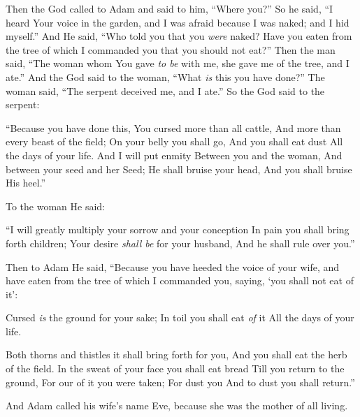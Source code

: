 \bverse Then the \lord God called to Adam and said to him, ``Where \are you?''
\bverse So he said, ``I heard Your voice in the garden, and I was afraid because I was naked; and I hid myself.''
\bverse And He said, ``Who told you that you \textit{were} naked? Have you eaten from the tree of which I commanded you that you should not eat?''
\bverse Then the man said, ``The woman whom You gave \textit{to be} with me, she gave me of the tree, and I ate.''
\bverse And the \lord God said to the woman, ``What \textit{is} this you have done?'' The woman said, ``The serpent deceived me, and I ate.''
\bverse So the \lord God said to the serpent: 
\begin{bquotation}
``Because you have done this, You \are cursed more than all cattle, And more than every beast of the field; On your belly you shall go, And you shall eat dust All the days of your life.
\bverse And I will put enmity Between you and the woman, And between your seed and her Seed; He shall bruise your head, And you shall bruise His heel.''
\end{bquotation}
\bverse To the woman He said: 
\begin{bquotation}
``I will greatly multiply your sorrow and your conception In pain you shall bring forth children; Your desire \textit{shall be} for your husband, And he shall rule over you.''
\end{bquotation}
\bverse Then to Adam He said, ``Because you have heeded the voice of your wife, and have eaten from the tree of which I commanded you, saying, `you shall not eat of it':
\begin{bquotation}
Cursed \textit{is} the ground for your sake; In toil you shall eat \textit{of} it All the days of your life.

\bverse Both thorns and thistles it shall bring forth for you, And you shall eat the herb of the field.
\bverse In the sweat of your face you shall eat bread Till you return to the ground, For our of it you were taken; For dust you \are And to dust you shall return.''
\end{bquotation}
\bverse And Adam called his wife's name Eve, because she was the mother of all living.

